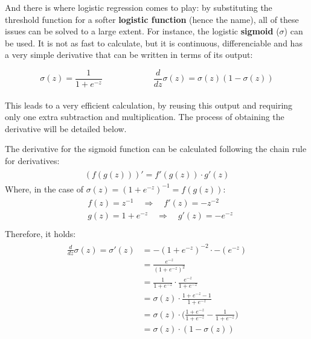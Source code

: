 And there is where logistic regression comes to play: by substituting the threshold function for a softer \textbf{logistic function} (hence the name), all of these issues can be solved to a large extent. For instance, the logistic \textbf{sigmoid} (\(\sigma\)) can be used. It is not as fast to calculate, but it is continuous, differenciable and has a very simple derivative that can be written in terms of its output:

\begin{equation*}
  \sigma(z) = \frac{1}{1+e^{-z}} \qquad \qquad \qquad \frac{d}{dz}\sigma(z) = \sigma(z)(1-\sigma(z))
\end{equation*}\\

This leads to a very efficient calculation, by reusing this output and requiring only one extra subtraction and multiplication. The process of obtaining the derivative will be detailed below.

\begin{tcolorbox}

  The derivative for the sigmoid function can be calculated following the chain rule for derivatives:
  \begin{align*}
    \begin{aligned}
      (f(g(z)))' = f'(g(z))\cdot g'(z)
    \end{aligned}
  \end{align*}
  Where, in the case of \(\sigma(z) = (1+e^{-z})^{-1} = f(g(z))\):
  \begin{align*}
    \begin{aligned}
      & f(z) = z^{-1} \quad \Longrightarrow \quad f'(z) = -z^{-2}\\
      & g(z) = 1+e^{-z} \quad \Longrightarrow \quad g'(z) = -e^{-z}\\
    \end{aligned}
  \end{align*}
  Therefore, it holds:
  \begin{align*}
    \begin{aligned}
      \frac{d}{dz}\sigma(z) = \sigma'(z) &= -(1+e^{-z})^{-2} \cdot -(e^{-z})\\
      & = \frac{e^{-z}}{(1+e^{-z})^{2}}\\
      & = \frac{1}{1+e^{-z}} \cdot \frac{e^{-z}}{1+e^{-z}}\\
      & = \sigma(z) \cdot \frac{1+e^{-z}-1}{1+e^{-z}}\\
      & = \sigma(z) \cdot  \big( \frac{1+e^{-z}}{1+ e^{-z}} - \frac{1}{1+e^{-z}} \big)\\
      & = \sigma(z) \cdot (1 - \sigma(z))\\
    \end{aligned}
  \end{align*}   %
\end{tcolorbox}


